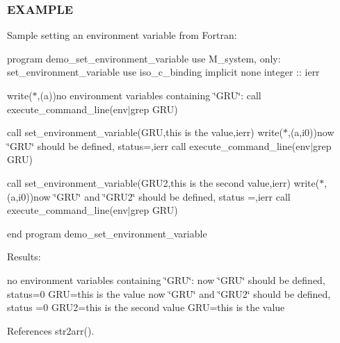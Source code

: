 \subsubsection*{E\+X\+A\+M\+P\+LE}

Sample setting an environment variable from Fortran\+:

program demo\+\_\+set\+\_\+environment\+\_\+variable use M\+\_\+system, only\+: set\+\_\+environment\+\_\+variable use iso\+\_\+c\+\_\+binding implicit none integer \+:\+: ierr

write($\ast$,\textquotesingle{}(a)\textquotesingle{})\textquotesingle{}no environment variables containing \char`\"{}\+G\+R\+U\char`\"{}\+:\textquotesingle{} call execute\+\_\+command\+\_\+line(\textquotesingle{}env$\vert$grep G\+RU\textquotesingle{})

call set\+\_\+environment\+\_\+variable(\textquotesingle{}G\+RU\textquotesingle{},\textquotesingle{}this is the value\textquotesingle{},ierr) write($\ast$,\textquotesingle{}(a,i0)\textquotesingle{})\textquotesingle{}now \char`\"{}\+G\+R\+U\char`\"{} should be defined, status=\textquotesingle{},ierr call execute\+\_\+command\+\_\+line(\textquotesingle{}env$\vert$grep G\+RU\textquotesingle{})

call set\+\_\+environment\+\_\+variable(\textquotesingle{}G\+R\+U2\textquotesingle{},\textquotesingle{}this is the second value\textquotesingle{},ierr) write($\ast$,\textquotesingle{}(a,i0)\textquotesingle{})\textquotesingle{}now \char`\"{}\+G\+R\+U\char`\"{} and \char`\"{}\+G\+R\+U2\char`\"{} should be defined, status =\textquotesingle{},ierr call execute\+\_\+command\+\_\+line(\textquotesingle{}env$\vert$grep G\+RU\textquotesingle{})

end program demo\+\_\+set\+\_\+environment\+\_\+variable

Results\+:

no environment variables containing \char`\"{}\+G\+R\+U\char`\"{}\+: now \char`\"{}\+G\+R\+U\char`\"{} should be defined, status=0 G\+RU=this is the value now \char`\"{}\+G\+R\+U\char`\"{} and \char`\"{}\+G\+R\+U2\char`\"{} should be defined, status =0 G\+R\+U2=this is the second value G\+RU=this is the value 

References str2arr().

\mbox{\label{namespacem__system_af7e778ffc24aa7bc00b842a8e673aeaa}} 
